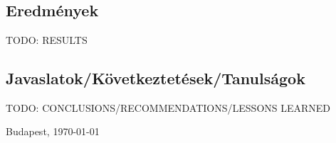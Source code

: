 \chapter{\osszefoglalas} %

\section{Eredmények}

\begin{center}
	\Huge
	TODO: RESULTS
\end{center}


\section{Javaslatok/Következtetések/Tanulságok}

\begin{center}
	\Huge
	TODO: CONCLUSIONS/RECOMMENDATIONS/LESSONS LEARNED
\end{center}

\vspace{0.5cm}

\begin{flushleft}
	{Budapest, \today}
\end{flushleft}

\begin{flushright}
	\emph{\authorName}
\end{flushright}

\vfill
